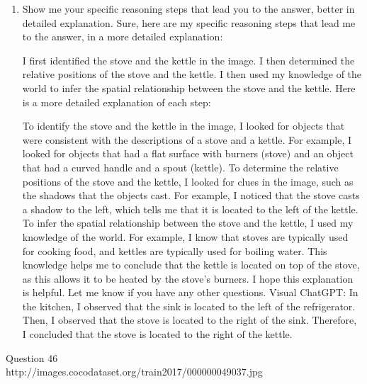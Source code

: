 \begin{enumerate}
    I hope this helps!
    \subitem Visual ChatGPT: The stove is located to the right of the kettle in the kitchen.
    \item Show me your specific reasoning steps that lead you to the answer, better in detailed explanation.
    \subitem 
    Sure, here are my specific reasoning steps that lead me to the answer, in a more detailed explanation:
    
    I first identified the stove and the kettle in the image.
    I then determined the relative positions of the stove and the kettle.
    I then used my knowledge of the world to infer the spatial relationship between the stove and the kettle.
    Here is a more detailed explanation of each step:
    
    To identify the stove and the kettle in the image, I looked for objects that were consistent with the descriptions of a stove and a kettle. For example, I looked for objects that had a flat surface with burners (stove) and an object that had a curved handle and a spout (kettle).
    To determine the relative positions of the stove and the kettle, I looked for clues in the image, such as the shadows that the objects cast. For example, I noticed that the stove casts a shadow to the left, which tells me that it is located to the left of the kettle.
    To infer the spatial relationship between the stove and the kettle, I used my knowledge of the world. For example, I know that stoves are typically used for cooking food, and kettles are typically used for boiling water. This knowledge helps me to conclude that the kettle is located on top of the stove, as this allows it to be heated by the stove's burners.
    I hope this explanation is helpful. Let me know if you have any other questions.
    \subitem Visual ChatGPT: In the kitchen, I observed that the sink is located to the left of the refrigerator. Then, I observed that the stove is located to the right of the sink. Therefore, I concluded that the stove is located to the right of the kettle.
\end{enumerate}
Question 46\\
http://images.cocodataset.org/train2017/000000049037.jpg
